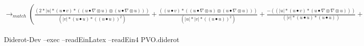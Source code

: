 \documentclass{article}
\begin{document}
\newline $\rightarrow_{match}(\frac{(2*|u|*(u \bullet v)*((u \bullet  \nabla  \otimes u) \otimes (u \bullet  \nabla  \otimes u)))}{(|v|*(u \bullet u)*((u \bullet u))^2)}+\frac{((u \bullet v)*((u \bullet  \nabla  \otimes u) \otimes (u \bullet  \nabla  \otimes u)))}{(|u|*|v|*((u \bullet u))^2)}+\frac{-((|u|*(u \bullet v)*(u \bullet  \nabla  \otimes  \nabla  \otimes u)))}{(|v|*(u \bullet u)*(u \bullet u))}+\frac{-((|u|*(u \bullet v)*(( \nabla  \otimes u)^T \bullet  \nabla  \otimes u)))}{(|v|*(u \bullet u)*(u \bullet u))}+\frac{-((((u \bullet  \nabla  \otimes u) \otimes (v \bullet  \nabla  \otimes u))))}{(|u|*|v|*(u \bullet u))}+\frac{(v \bullet  \nabla  \otimes  \nabla  \otimes u)}{(|u|*|v|)}+\frac{-((((v \bullet  \nabla  \otimes u) \otimes (u \bullet  \nabla  \otimes u))))}{(|u|*|v|*(u \bullet u))}+\frac{((u \bullet v)*((u \bullet  \nabla  \otimes u) \otimes (v \bullet  \nabla  \otimes v)))}{(|u|*|v|*(u \bullet u)*(v \bullet v))}+\frac{-((((v \bullet  \nabla  \otimes u) \otimes (v \bullet  \nabla  \otimes v))))}{(|u|*|v|*(v \bullet v))}+\frac{(2*(u \bullet v)*((v \bullet  \nabla  \otimes v) \otimes (v \bullet  \nabla  \otimes v)))}{(|u|*|v|*((v \bullet v))^2)}+\frac{((u \bullet v)*((v \bullet  \nabla  \otimes v) \otimes (u \bullet  \nabla  \otimes u)))}{((u \bullet u)*|v|*|u|*(v \bullet v))}+\frac{((u \bullet v)*((v \bullet  \nabla  \otimes v) \otimes (v \bullet  \nabla  \otimes v)))}{(|u|*|v|*((v \bullet v))^2)}+\frac{-(((u \bullet v)*(v \bullet  \nabla  \otimes  \nabla  \otimes v)))}{(|v|*|u|*(v \bullet v))}+\frac{-(((u \bullet v)*(( \nabla  \otimes v)^T \bullet  \nabla  \otimes v)))}{(|v|*|u|*(v \bullet v))}+\frac{-((((v \bullet  \nabla  \otimes v) \otimes (v \bullet  \nabla  \otimes u))))}{(|v|*|u|*(v \bullet v))}+\frac{-((((u \bullet  \nabla  \otimes u) \otimes (u \bullet  \nabla  \otimes v))))}{(|u|*|v|*(u \bullet u))}+\frac{(( \nabla  \otimes u)^T \bullet  \nabla  \otimes v)}{(|u|*|v|)}+\frac{-((((v \bullet  \nabla  \otimes v) \otimes (u \bullet  \nabla  \otimes v))))}{(|v|*|u|*(v \bullet v))}+\frac{(u \bullet  \nabla  \otimes  \nabla  \otimes v)}{(|u|*|v|)}+\frac{-((((u \bullet  \nabla  \otimes v) \otimes (u \bullet  \nabla  \otimes u))))}{(|v|*|u|*(u \bullet u))}+\frac{(( \nabla  \otimes v)^T \bullet  \nabla  \otimes u)}{(|u|*|v|)}+\frac{-((((u \bullet  \nabla  \otimes v) \otimes (v \bullet  \nabla  \otimes v))))}{(|u|*|v|*(v \bullet v))})$\\
\\
Diderot-Dev --exec --readEinLatex  --readEin4 PVO.diderot\\
\end{document}
